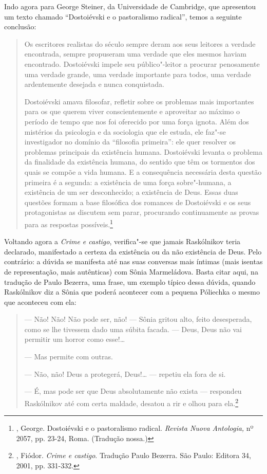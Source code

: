 Indo agora para George Steiner, da Universidade de Cambridge, que
apresentou um texto chamado ``Dostoiévski e o pastoralismo radical'',
temos a seguinte conclusão:

\begin{quote}
Os escritores realistas do século  sempre deram aos seus leitores a
verdade encontrada, sempre propuseram uma verdade que eles mesmos haviam
encontrado. Dostoiévski impele seu público"-leitor a procurar penosamente
uma verdade grande, uma verdade importante para todos, uma verdade
ardentemente desejada e nunca conquistada.

Dostoiévski amava filosofar, refletir sobre os problemas mais
importantes para os que querem viver conscientemente e aproveitar ao
máximo o período de tempo que nos foi oferecido por uma força ignota.
Além dos mistérios da psicologia e da sociologia que ele estuda, ele
faz"-se investigador no domínio da ``filosofia primeira'': ele quer
resolver os problemas principais da existência humana. Dostoiévski
levanta o problema da finalidade da existência humana, do sentido que
têm os tormentos dos quais se compõe a vida humana. E a consequência
necessária desta questão primeira é a segunda: a existência de uma força
sobre"-humana, a existência de um ser desconhecido; a existência de Deus.
Essas duas questões formam a base filosófica dos romances de Dostoiévski
e os seus protagonistas as discutem sem parar, procurando continuamente
as provas para as respostas possíveis.\footnote{, George.
Dostoiévski e o pastoralismo radical. \emph{Revista Nuova Antologia,}
nº 2057, pp. 23-24, Roma. (Tradução nossa.)}
\end{quote}

Voltando agora a \emph{Crime e castigo}, verifica"-se que jamais
Raskólnikov teria declarado, manifestado a certeza da existência ou da
não existência de Deus. Pelo contrário: a dúvida se manifesta até nas
suas conversas mais íntimas (mais isentas de representação, mais
autênticas) com Sônia Marmeládova. Basta citar aqui, na tradução de
Paulo Bezerra, uma frase, um exemplo típico dessa dúvida, quando
Raskólnikov diz a Sônia que poderá acontecer com a pequena Póliechka o
mesmo que aconteceu com ela:

\begin{quote}
--- Não! Não! Não pode ser, não! --- Sônia gritou alto, feito desesperada,
como se lhe tivessem dado uma súbita facada. --- Deus, Deus não vai
permitir um horror como esse!\ldots{}

--- Mas permite com outras.

--- Não, não! Deus a protegerá, Deus!\ldots{} --- repetiu ela fora de si.

--- É, mas pode ser que Deus absolutamente não exista --- respondeu
Raskólnikov até com certa maldade, desatou a rir e olhou para
ela.\footnote{, Fiódor. \emph{Crime e castigo}. Tradução
Paulo Bezerra. São Paulo: Editora 34, 2001, pp. 331-332.}
\end{quote}

